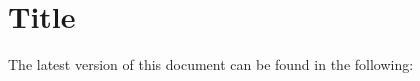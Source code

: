\part{Title}
\thispagestyle{empty}
\vfill
The latest version of this document can be found in the following:
\newpage
